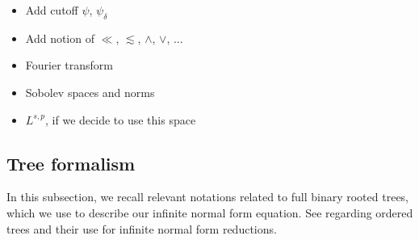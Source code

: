 \documentclass[%
11pt,  reqno]{amsart}
\newcommand{\red}{\color{red}}
\newcommand{\5}{\textup{V}}
\newcommand{\les}{\lesssim}
\newcommand{\dl}{\delta}
\theoremstyle{remark}
\numberwithin{equation}{section}
\numberwithin{theorem}{section}
\begin{document}
	
	{
		\red
		\begin{itemize}
			\item Add cutoff $\psi$, $\psi_\dl$
			
			\item Add notion of $\ll$, $\les$, $\land$, $\lor$, ...
			
			\item Fourier transform
			
			\item Sobolev spaces and norms
			
			\item $L^{s,p}$, if we decide to use this space
			
			
		\end{itemize}
	}


\subsection{Tree formalism}	
\label{SUB:tree}

In this subsection, we recall relevant notations related to full binary rooted trees, which we use to describe our infinite normal form equation.
See \cite{Kishimoto21, GKO} regarding ordered trees and their use for infinite normal form reductions. 
\end{document}
